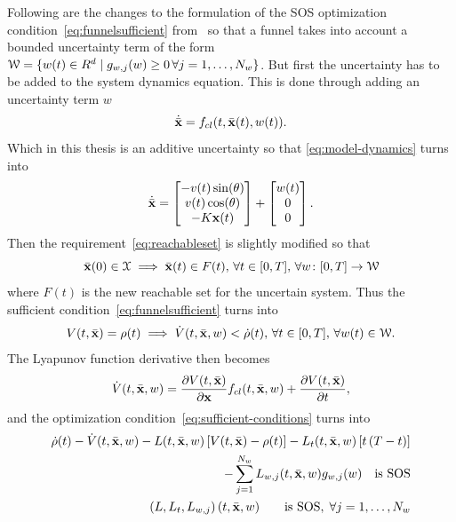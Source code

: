 Following are the changes to the formulation of the \ac{SOS} optimization
condition~\cref{eq:funnelsufficient} from~\cite{majumdarRobustOnlineMotion2013}
so that a funnel takes into account a bounded uncertainty term of the form
\(\mathcal{W} = \lbrace w(t) \in R^d \mid g_{w,j}(w) \geq 0\, \forall j =
  1,\ldots,N_w\rbrace\). But first the uncertainty has to be added to the system
dynamics equation. This is done through adding an uncertainty term \(w\)
\begin{equation}
  \dot{\bar{\mathsf{\mathbf{x}}}} = f_{cl}(t, \bar{\mathsf{\mathbf{x}}}(t), w(t)).
\end{equation}
Which in this thesis is an additive uncertainty so that \cref{eq:model-dynamics}
turns into
\begin{equation}
  \dot{\bar{\vect{x}}} = %
  \begin{bmatrix}
    -v(t)\sin(\theta) \\
    v(t)\cos(\theta) \\
    -K\vect{x} (t) \\
  \end{bmatrix}
  +
  \begin{bmatrix}
    w(t) \\
    0 \\
    0
  \end{bmatrix}.
\end{equation}
Then the requirement~\cref{eq:reachableset} is slightly modified so that
\begin{equation}
  \label{eq:uncertain-reachableset}
  \bar{\mathsf{\mathbf{x}}}(0) \in \mathcal{X} \implies \bar{\mathsf{\mathbf{x}}}(t) \in F(t),\, \forall t \in
  [0,T], \, \forall w \colon [0,T] \rightarrow \mathcal{W}
\end{equation} 
where \(F(t)\) is the new reachable set for the uncertain system. Thus the
sufficient condition~\cref{eq:funnelsufficient} turns into
\begin{equation}
  \label{eq:funneluncertain-sufficient}
  V(t,\bar{\mathsf{\mathbf{x}}}) = \rho(t) \implies \dot{V}(t,\bar{\mathsf{\mathbf{x}}},w) < \dot{\rho}(t), \, \forall t \in [0,T], \, \forall w(t) \in \mathcal{W}.
\end{equation}
The Lyapunov function derivative then becomes
\begin{equation}
  \dot{V}(t,\bar{\mathsf{\mathbf{x}}}, w) = \frac{\partial V(t,\bar{\mathsf{\mathbf{x}}})}{\partial \mathsf{\mathbf{x}}} f_{cl}(t,\bar{\mathsf{\mathbf{x}}},w) + \frac{\partial V(t,\bar{\mathsf{\mathbf{x}}})}{\partial t},
\end{equation}
and the optimization condition~\cref{eq:sufficient-conditions} turns into
\begin{align}
  \label{eq:optimizationconditionuncertain}
  \dot{\rho}(t) - \dot{V}(t,\bar{\mathsf{\mathbf{x}}},w) - L(t,\bar{\mathsf{\mathbf{x}}},w) \left[ V(t,\bar{\mathsf{\mathbf{x}}}) - \rho(t) \right] - L_{t}(t,\bar{\mathsf{\mathbf{x}}},w)\left[ t\left( T - t \right) \right]  & \nonumber \\
  - \sum_{j=1}^{N_{w}} L_{w,j}(t,\bar{\mathsf{\mathbf{x}}},w)g_{w,j}(w) \quad \text{is SOS} &  \\
  \left( L, L_t, L_{w,j} \right) (t,\bar{\mathsf{\mathbf{x}}},w) \qquad \text{is SOS}, \; \forall j = 1,\ldots,N_w \nonumber
\end{align}
